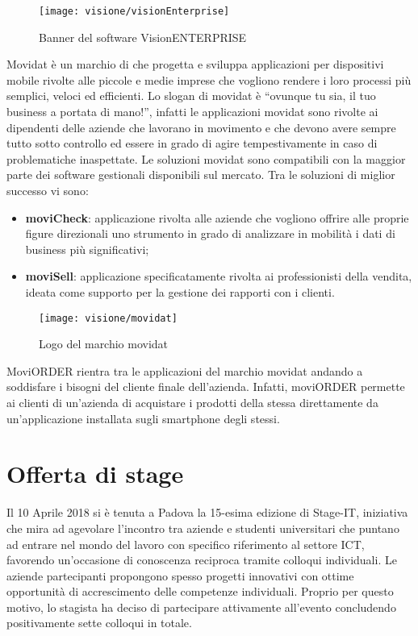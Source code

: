 \begin{figure}[!h] 
    \centering 
    \texttt{[image: visione/visionEnterprise]} 
    \caption{Banner del software VisionENTERPRISE}
\end{figure}

Movidat è un marchio di \visione{} che progetta e sviluppa applicazioni per dispositivi mobile rivolte alle piccole e medie imprese che vogliono rendere i loro processi più semplici, veloci ed efficienti. Lo slogan di movidat è ``ovunque tu sia, il tuo business a portata di mano!'', infatti le applicazioni movidat sono rivolte ai dipendenti delle aziende che lavorano in movimento e che devono avere sempre tutto sotto controllo ed essere in grado di agire tempestivamente in caso di problematiche inaspettate. Le soluzioni movidat sono compatibili con la maggior parte dei software gestionali disponibili sul mercato. Tra le soluzioni di miglior successo vi sono:
\begin{itemize}
	\item \textbf{moviCheck}: applicazione rivolta alle aziende che vogliono offrire alle proprie figure direzionali uno strumento in grado di analizzare in mobilità i dati di business più significativi;
	\item \textbf{moviSell}: applicazione specificatamente rivolta ai professionisti della vendita, ideata come supporto per la gestione dei rapporti con i clienti.
\end{itemize}

\begin{figure}[!h] 
    \centering 
    \texttt{[image: visione/movidat]} 
    \caption{Logo del marchio movidat}
\end{figure}

MoviORDER rientra tra le applicazioni del marchio movidat andando a soddisfare i bisogni del cliente finale dell'azienda. Infatti, moviORDER permette ai clienti di un'azienda di acquistare i prodotti della stessa direttamente da un'applicazione installata sugli smartphone degli stessi.

\section{Offerta di stage}

Il 10 Aprile 2018 si è tenuta a Padova la 15-esima edizione di Stage-IT, iniziativa che mira ad agevolare l'incontro tra aziende e studenti universitari che puntano ad entrare nel mondo del lavoro con specifico riferimento al settore ICT, favorendo un'occasione di conoscenza reciproca tramite colloqui individuali. Le aziende partecipanti propongono spesso progetti innovativi con ottime opportunità di accrescimento delle competenze individuali. Proprio per questo motivo, lo stagista ha deciso di partecipare attivamente all'evento concludendo positivamente sette colloqui in totale. 

